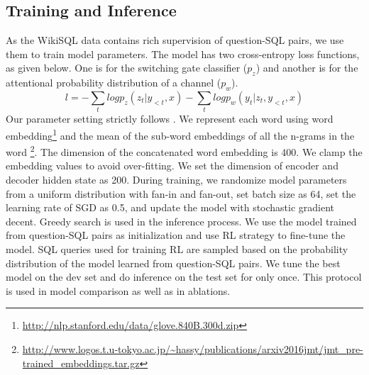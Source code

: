 \documentclass[11pt,a4paper]{article}
\begin{document}
\subsection{Training and Inference}
As the WikiSQL data contains rich supervision of question-SQL pairs, we use them to train model parameters.
The model has two cross-entropy loss functions, as given below.
One is for the switching gate classifier ($p_z$) and another is for the attentional probability distribution of a channel ($p_w$). 
\begin{equation}
l = -\sum_t log p_z(z_t| y_{<t}, x)-\sum_t log p_w(y_t | z_t, y_{<t}, x)
\end{equation}
Our parameter setting strictly follows .
We represent each word using word embedding\footnote{\url{http://nlp.stanford.edu/data/glove.840B.300d.zip}} \cite{pennington-socher-manning:2014:EMNLP2014} and the mean of the sub-word embeddings of all the n-grams in the word  \cite{hashimoto2016joint}\footnote{\url{http://www.logos.t.u-tokyo.ac.jp/~hassy/publications/arxiv2016jmt/jmt_pre-trained_embeddings.tar.gz}}.
The dimension of the concatenated word embedding is 400.
We clamp the embedding values to avoid over-fitting.
We set the dimension of encoder and decoder hidden state as 200.
During training, we randomize model parameters from a uniform distribution with fan-in and fan-out, set batch size as 64, set the learning rate of SGD as 0.5, and update the model with stochastic gradient decent.
Greedy search is used in the inference process.
We use the model trained from question-SQL pairs as initialization and use RL strategy to fine-tune the model.
SQL queries used for training RL are sampled based on the probability distribution of the model learned from question-SQL pairs.
We tune the best model on the dev set and do inference on the test set for only once.
This protocol is used in model comparison as well as in ablations. 
\end{document}
